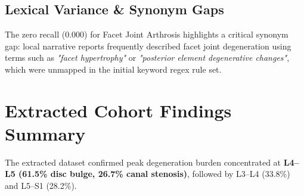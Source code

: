 \subsection{Lexical Variance \& Synonym Gaps}
The zero recall ($0.000$) for Facet Joint Arthrosis highlights a critical synonym gap: local narrative reports frequently described facet joint degeneration using terms such as \textit{"facet hypertrophy"} or \textit{"posterior element degenerative changes"}, which were unmapped in the initial keyword regex rule set.

\section{Extracted Cohort Findings Summary}
The extracted dataset confirmed peak degeneration burden concentrated at \textbf{L4--L5 (61.5\% disc bulge, 26.7\% canal stenosis)}, followed by L3--L4 (33.8\%) and L5--S1 (28.2\%).

